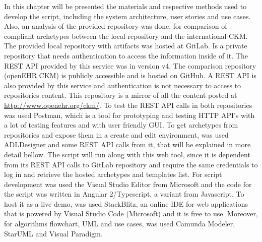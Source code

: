 \documentclass[mim_thesis.tex]{subfiles}
\begin{document}
In this chapter will be presented the materials and respective methods used to develop the script, including the system architecture, user stories and use cases. Also, an analysis of the provided repository was done, for comparison of compliant archetypes between the local repository and the international CKM.\\

The provided local repository with artifacts was hosted at GitLab. Is a private repository that needs authentication to access the information inside of it. The REST API provided by this service was in version v4. The comparison repository (openEHR CKM) is publicly accessible and is hosted on GitHub. A REST API is also provided by this service and authentication is not necessary to access to repositories content. This repository is a mirror of all the content posted at \url{http://www.openehr.org/ckm/}. To test the REST API calls in both repositories was used Postman, which is a tool for prototyping and testing HTTP API's with a lot of testing features and with user friendly GUI. To get archetypes from repositories and expose them in a create and edit environment, was used ADLDesigner and some REST API calls from it, that will be explained in more detail bellow. The script will run along with this web tool, since it is dependent from its REST API calls to GitLab repository and require the same credentials to log in and retrieve the hosted archetypes and templates list. For script development was used the Visual Studio Editor from Microsoft and the code for the script was written in Angular 2/Typescript, a variant from Javascript. To host it as a live demo, was used StackBlitz, an online IDE for web applications that is powered by Visual Studio Code (Microsoft) and it is free to use. Moreover, for algorithms flowchart, UML and use cases, was used Camunda Modeler, StarUML and Visual Paradigm. \\
\end{document}
